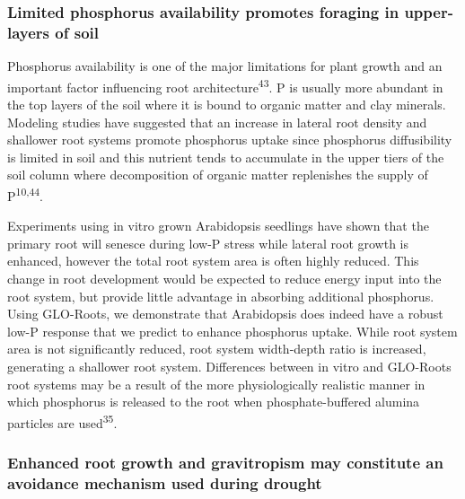 \documentclass[]{article}
\begin{document}
\subsubsection{Limited phosphorus availability promotes foraging in
upper-layers of
soil}\label{limited-phosphorus-availability-promotes-foraging-in-upper-layers-of-soil}

Phosphorus availability is one of the major limitations for plant growth
and an important factor influencing root
architecture\textsuperscript{43}. P is usually more abundant in the top
layers of the soil where it is bound to organic matter and clay
minerals. Modeling studies have suggested that an increase in lateral
root density and shallower root systems promote phosphorus uptake since
phosphorus diffusibility is limited in soil and this nutrient tends to
accumulate in the upper tiers of the soil column where decomposition of
organic matter replenishes the supply of P\textsuperscript{10,44}.

Experiments using in vitro grown Arabidopsis seedlings have shown that
the primary root will senesce during low-P stress while lateral root
growth is enhanced, however the total root system area is often highly
reduced. This change in root development would be expected to reduce
energy input into the root system, but provide little advantage in
absorbing additional phosphorus. Using GLO-Roots, we demonstrate that
Arabidopsis does indeed have a robust low-P response that we predict to
enhance phosphorus uptake. While root system area is not significantly
reduced, root system width-depth ratio is increased, generating a
shallower root system. Differences between in vitro and GLO-Roots root
systems may be a result of the more physiologically realistic manner in
which phosphorus is released to the root when phosphate-buffered alumina
particles are used\textsuperscript{35}.

\subsubsection{Enhanced root growth and gravitropism may constitute an
avoidance mechanism used during
drought}\label{enhanced-root-growth-and-gravitropism-may-constitute-an-avoidance-mechanism-used-during-drought}
\end{document}

